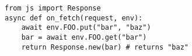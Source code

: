 \begin{verbatim}
from js import Response
async def on_fetch(request, env):
    await env.FOO.put("bar", "baz")
    bar = await env.FOO.get("bar")
    return Response.new(bar) # returns "baz"
\end{verbatim}